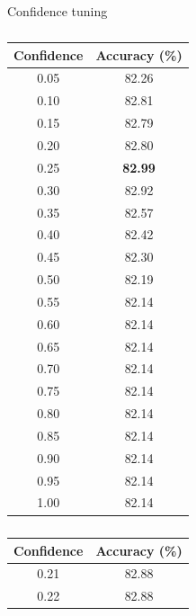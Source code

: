 \documentclass[12pt]{article}
\begin{document}
      \singlespacing
      \begin{table}[H]
          \caption{Confidence tuning}
          \begin{subtable}{.34\linewidth}
            \centering
            \caption{}
            \begin{tabular}{c|c}
              \toprule
              \multicolumn{1}{c|}{Confidence} & \multicolumn{1}{c}{Accuracy (\%)} \\
              \midrule
              0.05  & 82.26 \\
              0.10  & 82.81 \\
              0.15  & 82.79 \\
              0.20  & 82.80 \\
              0.25  & \textbf{82.99} \\
              0.30  & 82.92 \\
              0.35  & 82.57 \\
              0.40  & 82.42 \\
              0.45  & 82.30 \\
              0.50  & 82.19 \\
              0.55  & 82.14 \\
              0.60  & 82.14 \\
              0.65  & 82.14 \\
              0.70  & 82.14 \\
              0.75  & 82.14 \\
              0.80  & 82.14 \\
              0.85  & 82.14 \\
              0.90  & 82.14 \\
              0.95  & 82.14 \\
              1.00  & 82.14 \\
              \bottomrule
            \end{tabular}
            \label{tab:dt-con-a}
          \end{subtable}%
          \begin{subtable}{.34\linewidth}
            \centering
            \caption{}
            \begin{tabular}{c|c}
              \toprule
              \multicolumn{1}{c|}{Confidence} & \multicolumn{1}{c}{Accuracy (\%)} \\
              \midrule
              0.21  & 82.88 \\
              0.22  & 82.88 \\

\end{tabular}
\end{subtable}
\end{table}
\end{document}
